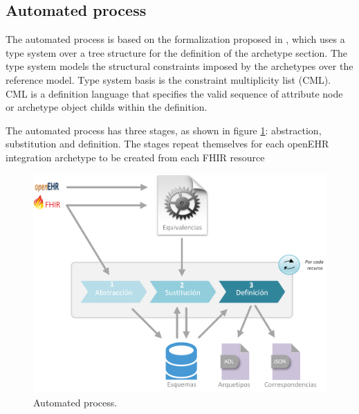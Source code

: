 \subsection{Automated process}

The automated process is based on the formalization proposed in \cite{Maldonado09}, which uses a type system over a tree structure for the definition of the archetype section. The type system models the structural constraints imposed by the archetypes over the reference model. Type system basis is the constraint multiplicity list (CML). CML is a definition language that specifies the valid sequence of attribute node or archetype object childs within the definition.

The automated process has three stages, as shown in figure \ref{fig:solution}: abstraction, substitution and definition. The stages repeat themselves for each openEHR integration archetype to be created from each FHIR resource

\begin{figure}[h]
  \centering
  \includegraphics[scale=0.5]{./images/solution}
  \caption{Automated process.}
  \label{fig:solution}
\end{figure}






